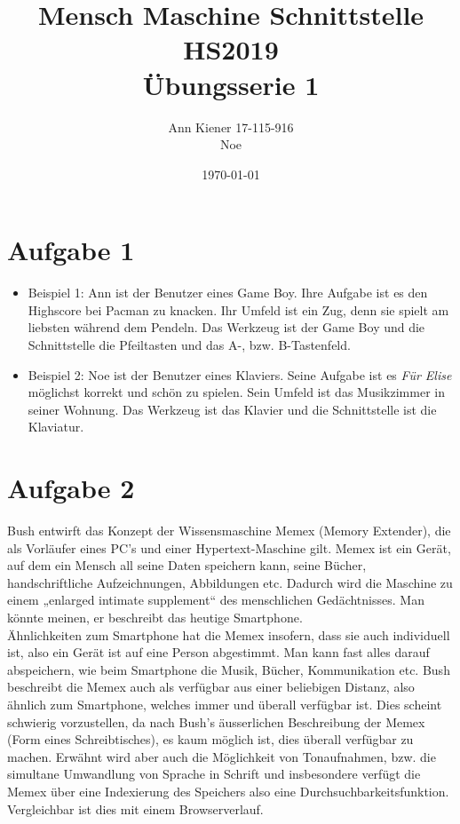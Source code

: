\documentclass{article}
\begin{document}
    \title{Mensch Maschine Schnittstelle \\ HS2019 \\ Übungsserie 1}
    \date{\today}
    \author{Ann Kiener 17-115-916 \\ Noe}
    \maketitle

    \section{Aufgabe 1}
    \begin{itemize}
        \item Beispiel 1: Ann ist der Benutzer eines Game Boy. Ihre Aufgabe ist es 
        den Highscore bei Pacman zu knacken. Ihr Umfeld ist ein Zug, denn sie spielt
        am liebsten während dem Pendeln. Das Werkzeug ist der Game Boy und die
        Schnittstelle die Pfeiltasten und das A-, bzw. B-Tastenfeld.
        \item Beispiel 2: Noe ist der Benutzer eines Klaviers. Seine Aufgabe ist es
        \textit{Für Elise} möglichst korrekt und schön zu spielen. Sein Umfeld ist
        das Musikzimmer in seiner Wohnung. Das Werkzeug ist das Klavier und die 
        Schnittstelle ist die Klaviatur.
    \end{itemize}

    \section{Aufgabe 2}
   Bush entwirft das Konzept der Wissensmaschine Memex (Memory Extender), 
    die als Vorläufer eines PC's und einer Hypertext-Maschine gilt. Memex ist ein Gerät,
    auf dem ein Mensch all seine Daten speichern kann, seine Bücher, handschriftliche Aufzeichnungen, Abbildungen etc.
     Dadurch wird die Maschine zu einem „enlarged intimate supplement“ des menschlichen Gedächtnisses. Man könnte meinen,
     er beschreibt das heutige Smartphone.\\
     Ähnlichkeiten zum Smartphone hat die Memex insofern, dass sie auch individuell ist,
     also ein Gerät ist auf eine Person abgestimmt. Man kann fast alles darauf abspeichern,
     wie beim Smartphone die Musik, Bücher, Kommunikation etc. 
     Bush beschreibt die Memex auch als verfügbar aus einer beliebigen Distanz, also ähnlich
     zum Smartphone, welches immer und überall verfügbar ist. Dies scheint schwierig vorzustellen,
     da nach Bush's äusserlichen Beschreibung der Memex (Form eines Schreibtisches), es kaum möglich ist,
     dies überall verfügbar zu machen. 
     Erwähnt wird aber auch die Möglichkeit von Tonaufnahmen, bzw. die simultane Umwandlung von Sprache in Schrift und insbesondere
     verfügt die Memex über eine Indexierung des Speichers also eine Durchsuchbarkeitsfunktion. Vergleichbar
     ist dies mit einem Browserverlauf.
    
\end{document}
